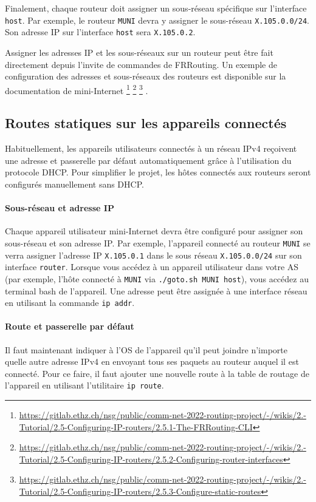 \documentclass[a4paper, 11pt]{article}
\begin{document}
Finalement, chaque routeur doit assigner un sous-réseau spécifique sur
l'interface \texttt{host}. Par exemple,
le routeur \texttt{MUNI} devra y assigner le sous-réseau
\texttt{X.105.0.0/24}. Son adresse IP sur l'interface \texttt{host}
sera \texttt{X.105.0.2}.

Assigner les adresses IP et les sous-réseaux sur un routeur
peut être fait directement depuis l'invite de commandes
de FRRouting. Un exemple de configuration des adresses
et sous-réseaux des routeurs est disponible sur la
documentation de
mini-Internet
\footnote{\url{https://gitlab.ethz.ch/nsg/public/comm-net-2022-routing-project/-/wikis/2.-Tutorial/2.5-Configuring-IP-routers/2.5.1-The-FRRouting-CLI}}
\footnote{\url{https://gitlab.ethz.ch/nsg/public/comm-net-2022-routing-project/-/wikis/2.-Tutorial/2.5-Configuring-IP-routers/2.5.2-Configuring-router-interfaces}}
\footnote{\url{https://gitlab.ethz.ch/nsg/public/comm-net-2022-routing-project/-/wikis/2.-Tutorial/2.5-Configuring-IP-routers/2.5.3-Configure-static-routes}}
.
\subsection{Routes statiques sur les appareils connectés}

Habituellement, les appareils utilisateurs connectés à un réseau
IPv4 reçoivent une adresse et passerelle par défaut automatiquement
grâce à l'utilisation du protocole DHCP. Pour simplifier le projet,
les hôtes connectés aux routeurs seront configurés manuellement
sans DHCP. 

\paragraph*{Sous-réseau et adresse IP} 
Chaque appareil utilisateur mini-Internet devra
être configuré pour assigner son sous-réseau et son adresse IP.
Par exemple, l'appareil connecté au routeur \texttt{MUNI} se verra
assigner l'adresse IP \texttt{X.105.0.1} dans le sous réseau
\texttt{X.105.0.0/24} sur son interface \texttt{router}.
Lorsque vous accédez à un appareil utilisateur dans votre AS
(par exemple, l'hôte connecté à \texttt{MUNI} via
\texttt{./goto.sh MUNI host}), vous accédez au terminal
bash de l'appareil.
Une adresse peut être assignée à une interface réseau en utilisant
la commande \texttt{ip addr}.

\paragraph*{Route et passerelle par défaut}
Il faut maintenant indiquer à l'OS de l'appareil qu'il peut joindre
n'importe quelle autre adresse IPv4 en envoyant tous ses paquets
au routeur auquel il est connecté. Pour ce faire, il faut ajouter une
nouvelle route à la table de routage de l'appareil en utilisant
l'utilitaire \texttt{ip route}.
\end{document}
